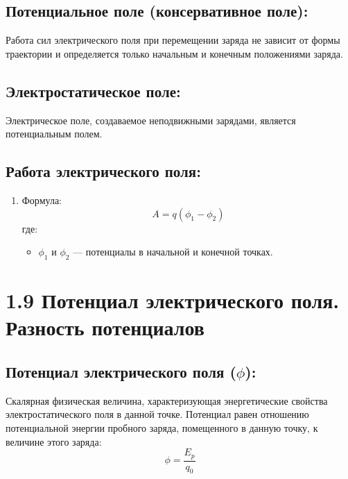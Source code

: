 \documentclass[a4paper,12pt]{article}
\begin{document}
\subsection*{Потенциальное поле (консервативное поле):}
\vspace{-3pt}
Работа сил электрического поля при перемещении заряда не зависит от формы траектории и определяется только начальным и конечным положениями заряда.

\vspace{-9pt}
\subsection*{Электростатическое поле:}
\vspace{-3pt}
Электрическое поле, создаваемое неподвижными зарядами, является потенциальным полем.

\vspace{-9pt}
\subsection*{Работа электрического поля:}
\vspace{-3pt}
\begin{enumerate}[itemsep=0pt, topsep=0pt, parsep=3pt]
  \item Формула:
  \vspace{-0.05em}
  $$ A = q(\phi_1 - \phi_2) $$
  где:
  \begin{itemize} [itemsep=0pt, topsep=0pt, parsep=0pt]
    \item $\phi_1$ и $\phi_2$ — потенциалы в начальной и конечной точках.
  \end{itemize}
\end{enumerate}

\section*{1.9 Потенциал электрического поля. Разность потенциалов}
\vspace{-9pt}
\subsection*{Потенциал электрического поля ($\phi$):}
\vspace{-3pt}
Скалярная физическая величина, характеризующая энергетические свойства электростатического поля в данной точке. Потенциал равен отношению потенциальной энергии пробного заряда, помещенного в данную точку, к величине этого заряда:
\vspace{-0.05em}
$$ \phi = \frac{E_p}{q_0} $$
\end{document}
